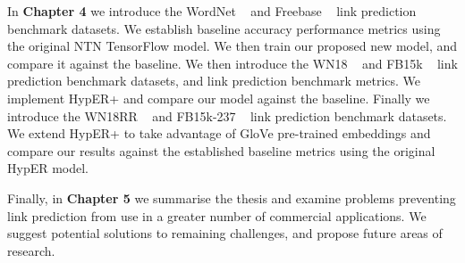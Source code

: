 \noindent In \textbf{Chapter 4} we introduce the WordNet \unskip ~\citep{miller1995wordnet} and Freebase \unskip ~\citep{bollacker2008freebase} link prediction benchmark datasets. We establish baseline accuracy performance metrics using the original NTN TensorFlow model. We then train our proposed new model, and compare it against the baseline. We then introduce the WN18 \unskip ~\citep{bordes2014semantic} and FB15k \unskip ~\citep{bordes2013translating} link prediction benchmark datasets, and link prediction benchmark metrics. We implement HypER+ and compare our model against the baseline. Finally we introduce the WN18RR \unskip ~\citep{dettmers2018convolutional} and FB15k-237 \unskip ~\citep{toutanova2015observed} link prediction benchmark datasets. We extend HypER+ to take advantage of GloVe pre-trained embeddings and compare our results against the established baseline metrics using the original HypER model. \par

\noindent Finally, in \textbf{Chapter 5} we summarise the thesis and examine problems preventing link prediction from use in a greater number of commercial applications. We suggest potential solutions to remaining challenges, and propose future areas of research.

